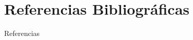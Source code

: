 \section{Referencias Bibliográficas}

\begin{frame}{Referencias}%
    \nocite{*}
    \printbibliography
\end{frame}

\begin{frame}[plain]
\end{frame}